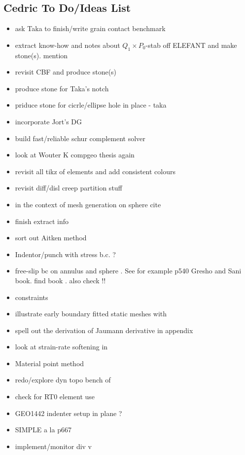 \subsection{Cedric To Do/Ideas List}

\begin{itemize}
\item ask Taka to finish/write grain contact benchmark
\item extract know-how and notes about $Q_1 \times P_0$-stab off ELEFANT and make stone(s). mention \cite{lisi12}
\item revisit CBF and produce stone(s)
\item produce stone for Taka's notch
\item priduce stone for cicrle/ellipse hole in place - taka
\item incorporate Jort's DG 
\item build fast/reliable schur complement solver
\item look at Wouter K compgeo thesis again
\item revisit all tikz of elements and add consistent colours
\item revisit diff/disl creep partition stuff
\item in the context of mesh generation on sphere cite \cite{moma19}
\item finish extract info 
\item sort out Aitken method
\item Indentor/punch with stress b.c. ?
\item free-slip bc on annulus and sphere . See for example p540 Gresho and Sani book. find book \cite{deab72}.
also check \cite{ensg82} !!
\item constraints \cite{absh79}
\item illustrate early boundary fitted static meshes with \cite{thar85}
\item \cite{bepo10} spell out the derivation of Jaumann derivative in appendix
\item look at strain-rate softening in \cite{belz02}
\item Material point method \cite{sucs94,susc96,susp07}
\item redo/explore dyn topo bench of \cite{bore19}
\item check \cite{bufm19} for RT0 element use
\item GEO1442 indenter setup in plane ?
\item SIMPLE a la p667 \cite{john16} 
\item implement/monitor div v

\end{itemize}
